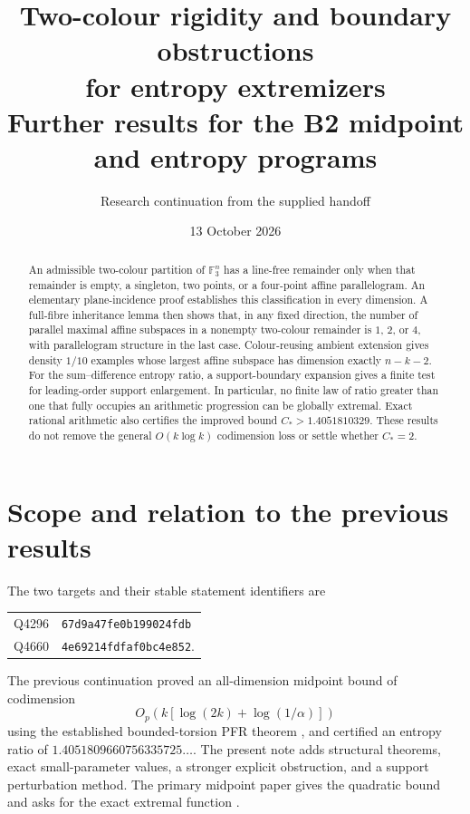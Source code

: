 \documentclass[11pt]{article}
\title{\vspace{-12mm}\textbf{Two-colour rigidity and boundary obstructions\\for entropy extremizers}\\[4pt]\large Further results for the B2 midpoint and entropy programs}
\author{Research continuation from the supplied handoff}
\date{13 October 2026}
\theoremstyle{remark}
\newcommand{\F}{\mathbb F_3}
\begin{document}
\maketitle\vspace{-6mm}
\begin{abstract}
An admissible two-colour partition of $\F^n$ has a line-free remainder only
when that remainder is empty, a singleton, two points, or a four-point affine
parallelogram. An elementary plane-incidence proof establishes this
classification in every dimension. A full-fibre inheritance lemma then shows
that, in any fixed direction, the number of parallel maximal affine subspaces
in a nonempty two-colour remainder is $1$, $2$, or $4$, with parallelogram
structure in the last case. Colour-reusing ambient extension gives density
$1/10$ examples whose largest affine subspace has dimension exactly $n-k-2$.
For the sum--difference entropy ratio, a support-boundary expansion gives a
finite test for leading-order support enlargement. In particular, no finite
law of ratio greater than one that fully occupies an arithmetic progression
can be globally extremal. Exact rational arithmetic also certifies the
improved bound $C_*>1.4051810329$. These results do not remove the general
$O(k\log k)$ codimension loss or settle whether $C_*=2$.
\end{abstract}

\section{Scope and relation to the previous results}

The two targets and their stable statement identifiers are
\begin{center}
\begin{tabular}{ll}
Q4296 & \texttt{67d9a47fe0b199024fdb}\\
Q4660 & \texttt{4e69214fdfaf0bc4e852}.
\end{tabular}
\end{center}
The previous continuation \cite{previous} proved an all-dimension midpoint
bound of codimension
\[
 O_p\!\left(k[\log(2k)+\log(1/\alpha)]\right)
\]
using the established bounded-torsion PFR theorem \cite{pfr}, and certified an entropy ratio of
$1.4051809660756335725\ldots$. The present note adds structural theorems,
exact small-parameter values, a stronger explicit obstruction, and a support
perturbation method. The primary midpoint paper gives the quadratic bound
and asks for the exact extremal function \cite{midpoint}.
\end{document}

